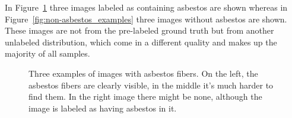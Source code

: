 In Figure~\ref{fig:asbestos_examples} three images labeled as containing asbestos are shown whereas in Figure~\ref{fig:non-asbestos_examples} three images without asbestos are shown. These images are not from the pre-labeled ground truth but from another unlabeled distribution, which come in a different quality and makes up the majority of all samples. \\

\begin{figure}[h]
\centering
\caption{Three examples of images with asbestos fibers. On the left, the asbestos fibers are clearly visible, in the middle it's much harder to find them. In the right image there might be none, although the image is labeled as having asbestos in it.}
\label{fig:asbestos_examples}
\end{figure}

